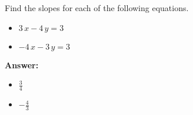  Find the slopes for each of the following equations. \begin{itemize}\item \( 3 \, x - 4 \, y = 3 \)\item \( -4 \, x - 3 \, y = 3 \)\end{itemize}

        \textbf{Answer:} \begin{itemize}\item \( \frac{3}{4} \)\item \( -\frac{4}{3} \)\end{itemize}
